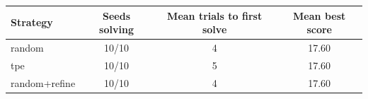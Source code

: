 \begin{tabular}{lccc}
\toprule
Strategy & Seeds solving & Mean trials to first solve & Mean best score \\
\midrule
random & 10/10 & 4 & 17.60 \\
tpe & 10/10 & 5 & 17.60 \\
random+refine & 10/10 & 4 & 17.60 \\
\bottomrule
\end{tabular}
